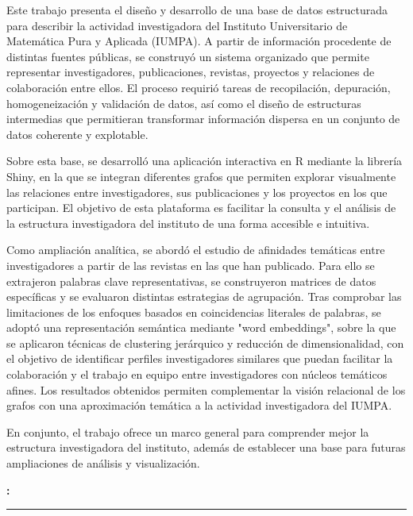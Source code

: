 \documentclass[11pt,spanish,listoffigures,listoftables]{tfgetsinf}
\renewenvironment{abstract}[1][catalan]{%
    \begingroup
    \selectlanguage{#1}\vspace{1em}\par\hfill
    {\sffamily\bfseries\Huge\abstractname}\par
    \vspace{0.5em}
}{%
    \par\noindent\textbf{\keywordsname:} \keywords
    \vspace{0.5em}
    \hrule
    \vspace{1em}
    \endgroup
}
\begin{document}
\begin{abstract}[spanish]
Este trabajo presenta el diseño y desarrollo de una base de datos estructurada para describir la actividad investigadora del Instituto Universitario de Matemática Pura y Aplicada (IUMPA). A partir de información procedente de distintas fuentes públicas, se construyó un sistema organizado que permite representar investigadores, publicaciones, revistas, proyectos y relaciones de colaboración entre ellos. El proceso requirió tareas de recopilación, depuración, homogeneización y validación de datos, así como el diseño de estructuras intermedias que permitieran transformar información dispersa en un conjunto de datos coherente y explotable.

Sobre esta base, se desarrolló una aplicación interactiva en R mediante la librería Shiny, en la que se integran diferentes grafos que permiten explorar visualmente las relaciones entre investigadores, sus publicaciones y los proyectos en los que participan. El objetivo de esta plataforma es facilitar la consulta y el análisis de la estructura investigadora del instituto de una forma accesible e intuitiva.

Como ampliación analítica, se abordó el estudio de afinidades temáticas entre investigadores a partir de las revistas en las que han publicado. Para ello se extrajeron palabras clave representativas, se construyeron matrices de datos específicas y se evaluaron distintas estrategias de agrupación. Tras comprobar las limitaciones de los enfoques basados en coincidencias literales de palabras, se adoptó una representación semántica mediante "word embeddings", sobre la que se aplicaron técnicas de clustering jerárquico y reducción de dimensionalidad, con el objetivo de identificar perfiles investigadores similares que puedan facilitar la colaboración y el trabajo en equipo entre investigadores con núcleos temáticos afines. Los resultados obtenidos permiten complementar la visión relacional de los grafos con una aproximación temática a la actividad investigadora del IUMPA.

En conjunto, el trabajo ofrece un marco general para comprender mejor la estructura investigadora del instituto, además de establecer una base para futuras ampliaciones de análisis y visualización.
\end{abstract}
\end{document}
